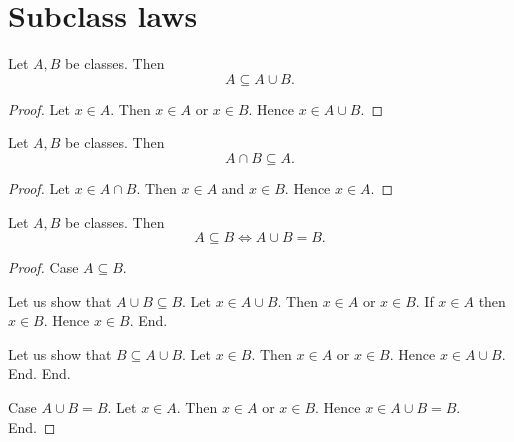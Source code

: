 \documentclass[../set-theory.tex]{subfiles}
\begin{document}
  \section*{Subclass laws}

  \begin{forthel}
    \begin{proposition}
      Let $A, B$ be classes.
      Then \[ A \subseteq A \cup B. \]
    \end{proposition}
    \begin{proof}
      Let $x \in A$.
      Then $x \in A$ or $x \in B$.
      Hence $x \in A \cup B$.
    \end{proof}
  \end{forthel}

  \begin{forthel}
    \begin{proposition}
      Let $A, B$ be classes.
      Then \[ A \cap B \subseteq A. \]
    \end{proposition}
    \begin{proof}
      Let $x \in A \cap B$.
      Then $x \in A$ and $x \in B$.
      Hence $x \in A$.
    \end{proof}
  \end{forthel}

  \begin{forthel}
    \begin{proposition}
      Let $A, B$ be classes.
      Then \[ A \subseteq B \iff A \cup B = B. \]
    \end{proposition}
    \begin{proof}
      Case $A \subseteq B$.

        Let us show that $A \cup B \subseteq B$.
          Let $x \in A \cup B$.
          Then $x \in A$ or $x \in B$.
          If $x \in A$ then $x \in B$.
          Hence $x \in B$.
        End.

        Let us show that $B \subseteq A \cup B$.
          Let $x \in B$.
          Then $x \in A$ or $x \in B$.
          Hence $x \in A \cup B$.
        End.
      End.

      Case $A \cup B = B$.
        Let $x \in A$.
        Then $x \in A$ or $x \in B$.
        Hence $x \in A \cup B = B$.
      End.
    \end{proof}
  \end{forthel}
\end{document}
